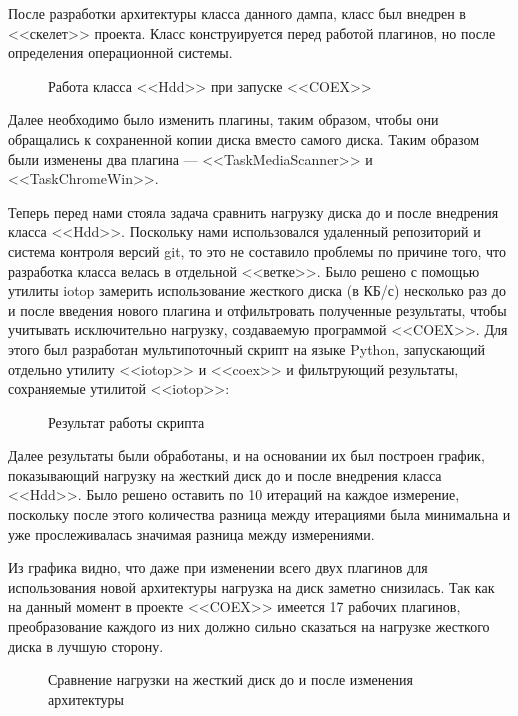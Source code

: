 После разработки архитектуры класса данного дампа, класс был внедрен в <<скелет>> проекта. Класс конструируется перед работой плагинов, но после определения операционной системы.

\begin{figure}[!ht]
\caption{ Работа класса <<Hdd>> при запуске <<COEX>> }
\label{bok_3:bok_3}
\end{figure}

Далее необходимо было изменить плагины, таким образом, чтобы они обращались к сохраненной копии диска вместо самого диска. Таким образом были изменены два плагина --- <<TaskMediaScanner>> и <<TaskChromeWin>>.

Теперь перед нами стояла задача сравнить нагрузку диска до и после внедрения класса <<Hdd>>. Поскольку нами использовался удаленный репозиторий и система контроля версий git, то это не составило проблемы по причине того, что разработка класса велась в отдельной <<ветке>>.
Было решено с помощью утилиты iotop замерить использование жесткого диска (в КБ/с) несколько раз до и после введения нового плагина и отфильтровать полученные результаты, чтобы учитывать исключительно нагрузку, создаваемую программой <<COEX>>. Для этого был разработан мультипоточный скрипт на языке Python, запускающий отдельно утилиту <<iotop>> и <<coex>> и фильтрующий результаты, сохраняемые утилитой <<iotop>>:

\begin{figure}[!h]
\caption{ Результат работы скрипта }
\label{bok_4:bok_4}
\end{figure}

Далее результаты были обработаны, и на основании их был построен график, показывающий нагрузку на жесткий диск до и после внедрения класса <<Hdd>>. Было решено оставить по 10 итераций на каждое измерение, поскольку после этого количества разница между итерациями была минимальна и уже прослеживалась значимая разница между измерениями.

Из графика видно, что даже при изменении всего двух плагинов для использования новой архитектуры нагрузка на диск заметно снизилась. Так как на данный момент в проекте <<COEX>> имеется 17 рабочих плагинов, преобразование каждого из них должно сильно сказаться на нагрузке жесткого диска в лучшую сторону.

\begin{figure}[!ht]
\caption{ Сравнение нагрузки на жесткий диск до и после изменения архитектуры }
\label{bok_5:bok_5}
\end{figure}

\clearpage
